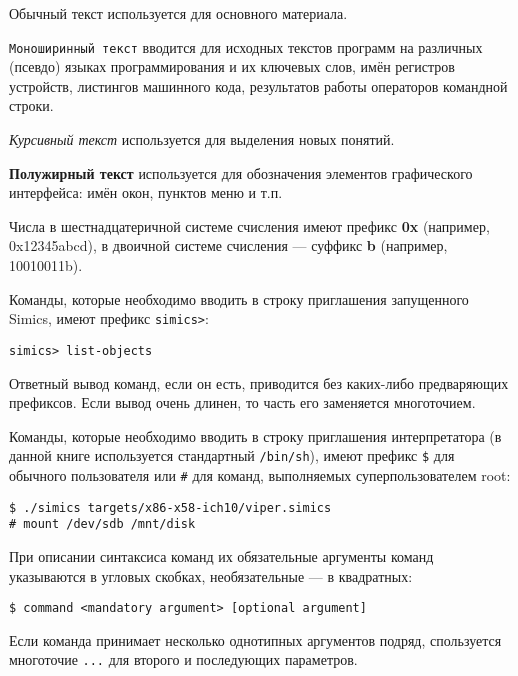 \begin{itemize*}
    \item Обычный текст используется для основного материала.
    \item \texttt{Моноширинный текст} вводится для исходных текстов программ на различных (псевдо) языках программирования и их ключевых слов,  имён регистров устройств, листингов машинного кода, результатов работы операторов командной строки.
    \item \textit{Курсивный текст} используется для выделения новых понятий.
    \item \textbf{Полужирный текст} используется для обозначения элементов графического интерфейса: имён окон, пунктов меню и т.п.
    \item Числа в шестнадцатеричной системе счисления имеют префикс \textbf{0x} (например, 0x12345abcd), в двоичной системе счисления --- суффикс \textbf{b} (например, 10010011b).
    \item Команды, которые необходимо вводить в строку приглашения запущенного Simics, имеют префикс \texttt{simics>}:
    \begin{lstlisting}
simics> list-objects
    \end{lstlisting}
	Ответный вывод команд, если он есть, приводится без каких-либо предваряющих префиксов. Если вывод очень длинен, то часть его заменяется многоточием.
    \item Команды, которые необходимо вводить в строку приглашения интерпретатора (в данной книге используется стандартный \texttt{/bin/sh}), имеют префикс \texttt{\$} для обычного пользователя или \texttt{\#} для команд, выполняемых суперпользователем root:
    \begin{lstlisting}
$ ./simics targets/x86-x58-ich10/viper.simics
# mount /dev/sdb /mnt/disk
    \end{lstlisting}

    \item При описании синтаксиса команд их обязательные аргументы команд указываются в угловых скобках, необязательные --- в квадратных:
    \begin{lstlisting}
$ command <mandatory argument> [optional argument]
    \end{lstlisting}
	Если команда принимает несколько однотипных аргументов подряд, спользуется многоточие \texttt{...} для второго и последующих параметров.
\end{itemize*}

